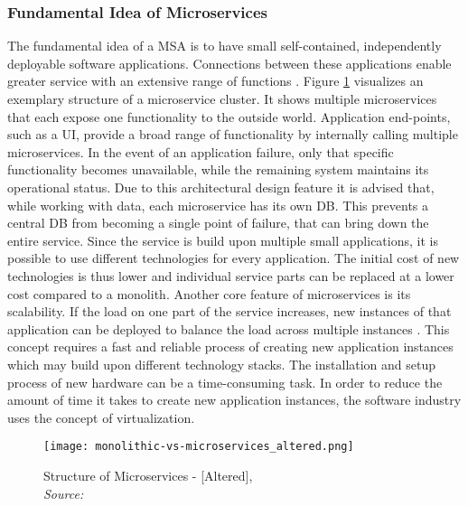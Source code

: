         \subsubsection{Fundamental Idea of Microservices}\label{sssec::micro}
        The fundamental idea of a \ac{MSA} is to have small self-contained, independently deployable software applications. Connections between these applications enable greater service with an extensive range of functions \cite{micro}. Figure \ref{fig::micro} visualizes an exemplary structure of a microservice cluster. It shows multiple microservices that each expose one functionality to the outside world. Application end-points, such as a \ac{UI}, provide a broad range of functionality by internally calling multiple microservices. In the event of an application failure, only that specific functionality becomes unavailable, while the remaining system maintains its operational status. Due to this architectural design feature it is advised that, while working with data, each microservice has its own \ac{DB}. This prevents a central \acl{DB} from becoming a single point of failure, that can bring down the entire service. Since the service is build upon multiple small applications, it is possible to use different technologies for every application. The initial cost of new technologies is thus lower and individual service parts can be replaced at a lower cost compared to a monolith. Another core feature of microservices is its scalability. If the load on one part of the service increases, new instances of that application can be deployed to balance the load across multiple instances \cite{micro}. This concept requires a fast and reliable process of creating new application instances which may build upon different technology stacks.\newline
        The installation and setup process of new hardware can be a time-consuming task. In order to reduce the amount of time it takes to create new application instances, the software industry uses the concept of virtualization.

        \begin{figure}
            \centering
            \texttt{[image: monolithic-vs-microservices\_altered.png]}
            \caption{Structure of Microservices - [Altered], \\\textit{Source:~\cite{redhat_micro}}}\label{fig::micro}
        \end{figure}


